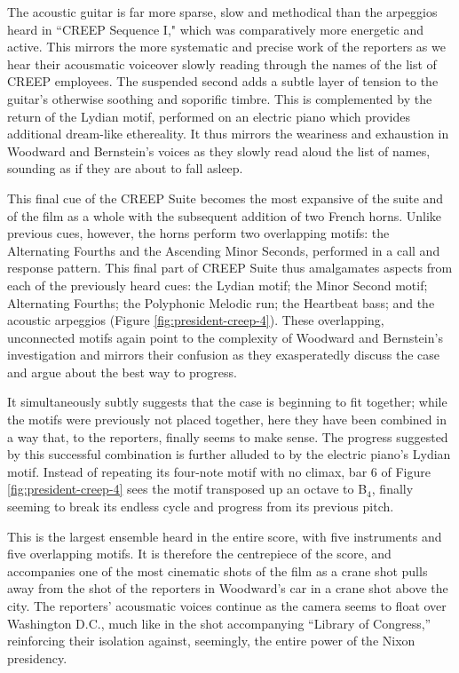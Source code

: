 The acoustic guitar is far more sparse, slow and methodical than the arpeggios heard in ``CREEP Sequence I," which was comparatively more energetic and active.
This mirrors the more systematic and precise work of the reporters as we hear their acousmatic voiceover slowly reading through the names of the list of CREEP employees.
The suspended second adds a subtle layer of tension to the guitar’s otherwise soothing and soporific timbre.
This is complemented by the return of the Lydian motif, performed on an electric piano which provides additional dream-like ethereality.
It thus mirrors the weariness and exhaustion in Woodward and Bernstein's voices as they slowly read aloud the list of names, sounding as if they are about to fall asleep.

This final cue of the CREEP Suite becomes the most expansive of the suite and of the film as a whole with the subsequent addition of two French horns.
Unlike previous cues, however, the horns perform two overlapping motifs: the Alternating Fourths and the Ascending Minor Seconds, performed in a call and response pattern.
This final part of CREEP Suite thus amalgamates aspects from each of the previously heard cues: the Lydian motif; the Minor Second motif; Alternating Fourths; the Polyphonic Melodic run; the Heartbeat bass; and the acoustic arpeggios (Figure \ref{fig:president-creep-4}).
These overlapping, unconnected motifs again point to the complexity of Woodward and Bernstein’s investigation and mirrors their confusion as they exasperatedly discuss the case and argue about the best way to progress.

It simultaneously subtly suggests that the case is beginning to fit together; while the motifs were previously not placed together, here they have been combined in a way that, to the reporters, finally seems to make sense. 
The progress suggested by this successful combination is further alluded to by the electric piano's Lydian motif.
Instead of repeating its four-note motif with no climax, bar 6 of Figure \ref{fig:president-creep-4} sees the motif transposed up an octave to B\flat$_4$, finally seeming to break its endless cycle and progress from its previous pitch.

This is the largest ensemble heard in the entire score, with five instruments and five overlapping motifs.
It is therefore the centrepiece of the score, and accompanies one of the most cinematic shots of the film as a crane shot pulls away from the shot of the reporters in Woodward's car in a crane shot above the city.
The reporters' acousmatic voices continue as the camera seems to float over Washington D.C., much like in the shot accompanying ``Library of Congress,” reinforcing their isolation against, seemingly, the entire power of the Nixon presidency.

